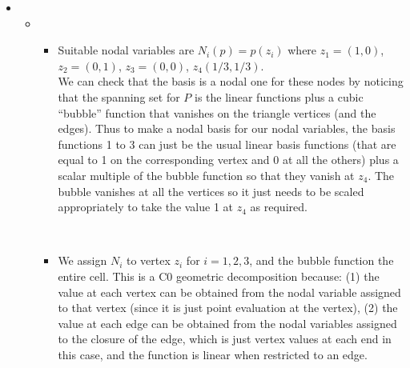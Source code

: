 \documentclass[11pt]{article}
\newcommand{\marb}[1]{\marginpar{~~\fbox{\,\mathstrut #1\,}}}
\newcommand{\marbup}[1]{\vspace*{-4mm} \par \marb{#1}}
\newcommand{\unseen}{\marbup{{\small unseen $\Downarrow$}}}
\newcommand{\simseen}{\marbup{{\small sim. seen $\Downarrow$}}}
\newcounter{count_marks}
\newcounter{count_amarks}
\newcounter{count_bmarks}
\newcounter{count_cmarks}
\newcounter{count_dmarks}
\newcounter{count_mmarks} %
\newcommand{\amarks}[1]{\addtocounter{count_marks}{#1} \addtocounter{count_amarks}{#1}\marginpar{~~\fbox{\,\mathstrut #1, A}}}
\newcommand{\bmarks}[1]{\addtocounter{count_marks}{#1} \addtocounter{count_bmarks}{#1}\marginpar{~~\fbox{\,\mathstrut #1, B}}}
\newenvironment{Question}[1] 
 {\begin{itemize} \item[\large #1.~~]}{\end{itemize}\vfill
}
\newenvironment{Part}[1] 
 {\begin{itemize} \item[(#1)~~]}{\end{itemize}}
\begin{document}
\begin{Question}{1}
\begin{Part}{b}\unseen
  \begin{Part}{i}
    Suitable nodal variables are $N_i(p)=p(z_i)$ where $z_1=(1,0)$,
    $z_2=(0,1)$, $z_3=(0,0)$, $z_4(1/3,1/3)$.\\ We can check that the
    basis is a nodal one for these nodes by noticing that the spanning
    set for $P$ is the linear functions plus a cubic ``bubble''
    function that vanishes on the triangle vertices (and the edges).
    Thus to make a nodal basis for our nodal variables, the basis
    functions 1 to 3 can just be the usual linear basis functions
    (that are equal to 1 on the corresponding vertex and 0 at all the
    others) plus a scalar multiple of the bubble function so that they
    vanish at $z_4$. The bubble vanishes at all the vertices
    so it just needs to be scaled appropriately to take the value 1 at
    $z_4$ as required.
    \amarks{6}\\
  \end{Part}
\begin{Part}{ii}\simseen
  We assign $N_i$ to vertex $z_i$ for $i=1,2,3$, and the bubble
  function the entire cell. This is a C0 geometric decomposition
  because: (1) the value at each vertex can be obtained from the nodal
  variable assigned to that vertex (since it is just point evaluation
  at the vertex), (2) the value at each edge can be obtained from the
  nodal variables assigned to the closure of the edge, which is just
  vertex values at each end in this case, and the function is linear
  when restricted to an edge.
  \bmarks{6}
\end{Part}
\end{Part}
\end{Question}
	
\end{document}
